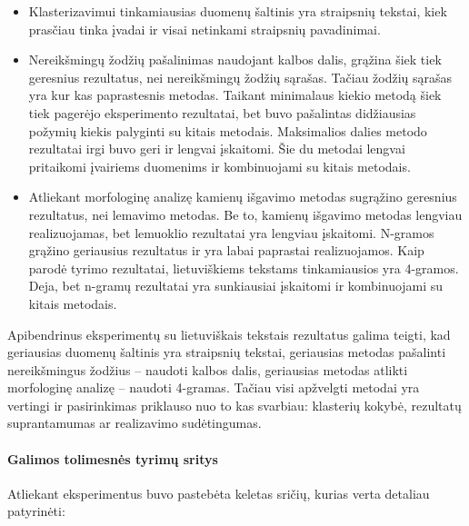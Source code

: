 \documentclass{VUMIFInfBakalaurinis}
\providecommand{\tightlist}{%
	  \setlength{\itemsep}{0pt}\setlength{\parskip}{0pt}}
\begin{document}
\begin{itemize}
\tightlist
\item
  Klasterizavimui tinkamiausias duomenų šaltinis yra straipsnių tekstai,
  kiek prasčiau tinka įvadai ir visai netinkami straipsnių pavadinimai.
\item
  Nereikšmingų žodžių pašalinimas naudojant kalbos dalis, grąžina šiek
  tiek geresnius rezultatus, nei nereikšmingų žodžių sąrašas. Tačiau
  žodžių sąrašas yra kur kas paprastesnis metodas. Taikant minimalaus kiekio
  metodą šiek tiek pagerėjo eksperimento rezultatai, bet buvo pašalintas didžiausias požymių
  kiekis palyginti su kitais metodais. Maksimalios dalies metodo rezultatai
  irgi buvo geri ir lengvai įskaitomi. Šie du metodai lengvai pritaikomi
  įvairiems duomenims ir kombinuojami su kitais metodais.
\item
  Atliekant morfologinę analizę kamienų išgavimo metodas sugrąžino
  geresnius rezultatus, nei lemavimo metodas. Be to, kamienų išgavimo
  metodas lengviau realizuojamas, bet lemuoklio rezultatai yra lengviau
  įskaitomi. N-gramos grąžino geriausius rezultatus ir yra labai
  paprastai realizuojamos. Kaip parodė tyrimo rezultatai, lietuviškiems
  tekstams tinkamiausios yra 4-gramos. Deja, bet n-gramų rezultatai yra
  sunkiausiai įskaitomi ir kombinuojami su kitais metodais.
\end{itemize}

Apibendrinus eksperimentų su lietuviškais tekstais
 rezultatus galima teigti, kad geriausias
duomenų šaltinis yra straipsnių tekstai, geriausias metodas pašalinti
nereikšmingus žodžius -- naudoti kalbos dalis, geriausias metodas atlikti
morfologinę analizę -- naudoti 4-gramas. Tačiau visi apžvelgti metodai
yra vertingi ir pasirinkimas priklauso nuo to kas svarbiau: klasterių
kokybė, rezultatų suprantamumas ar realizavimo sudėtingumas.

\paragraph{Galimos tolimesnės tyrimų sritys}

Atliekant eksperimentus buvo pastebėta keletas sričių, kurias verta
detaliau patyrinėti:
\end{document}
